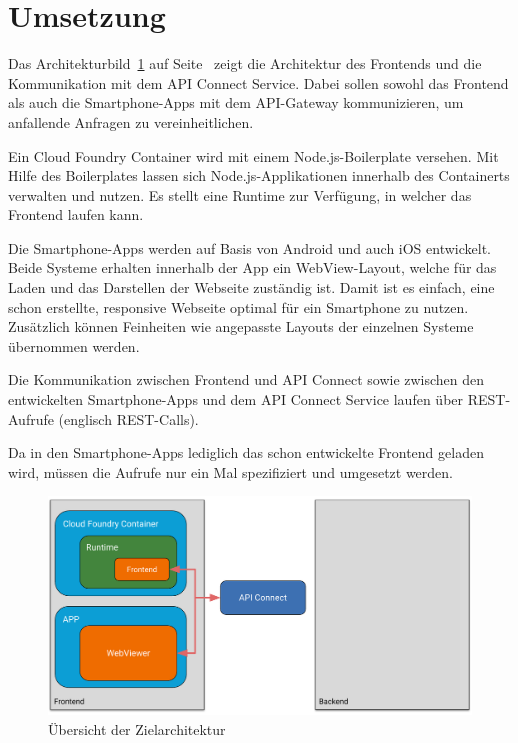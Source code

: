 \section{Umsetzung}
Das Architekturbild~\ref{fig:umsetzung_frontendarchitektur_4} auf Seite~\pageref{fig:umsetzung_frontendarchitektur_4}
zeigt die Architektur des Frontends und die Kommunikation mit dem API Connect Service. Dabei sollen sowohl das Frontend
als auch die Smartphone-Apps mit dem API-Gateway kommunizieren, um anfallende Anfragen zu vereinheitlichen.

Ein Cloud Foundry Container wird mit einem Node.js-Boilerplate versehen. Mit Hilfe des Boilerplates lassen sich
Node.js-Applikationen innerhalb des Containerts verwalten und nutzen. Es stellt eine Runtime zur Verfügung, in welcher
das Frontend laufen kann.

Die Smartphone-Apps werden auf Basis von Android und auch iOS entwickelt. Beide Systeme erhalten innerhalb der App ein
WebView-Layout, welche für das Laden und das Darstellen der Webseite zuständig ist. Damit ist es einfach, eine schon
erstellte, responsive Webseite optimal für ein Smartphone zu nutzen. Zusätzlich können Feinheiten wie angepasste Layouts
der einzelnen Systeme übernommen werden.

Die Kommunikation zwischen Frontend und API Connect sowie zwischen den entwickelten Smartphone-Apps und dem API Connect
Service laufen über REST-Aufrufe (englisch REST-Calls).

Da in den Smartphone-Apps lediglich das schon entwickelte Frontend geladen wird, müssen die Aufrufe nur ein Mal
spezifiziert und umgesetzt werden.

\begin{figure}[h]
    \centering
    \includegraphics[width=\textwidth]{images/kapitel_4/architektur_frontend.pdf}
    \caption{Übersicht der Zielarchitektur}
    \label{fig:umsetzung_frontendarchitektur_4}
\end{figure}

